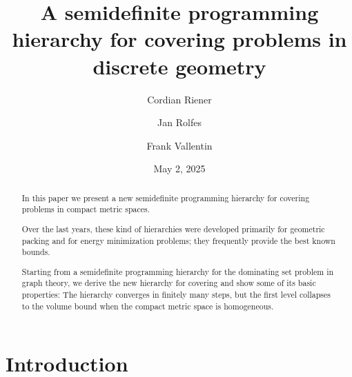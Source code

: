 \documentclass{amsart}
\begin{document}
\title{A semidefinite programming hierarchy for covering problems in
  discrete geometry}

\author{Cordian Riener}
\author{Jan Rolfes}
\author{Frank Vallentin}

\address{
  Cordian Riener,
  Department of Mathematics and Statistics, UiT The Arctic University
  of Norway,
  9037 Troms\o,
  Norway
}

\address{
  Jan Rolfes,
  Department of Mathematics, 
  Linköping University,
  SE-581 83 Linköping,
  Sweden}

\address{
  Frank Vallentin,
  Universit\"at zu K\"oln, Department Mathematik/Informatik, Abteilung
  Mathematik, Weyertal 86-90, 50931 K\"oln,  Germany}

\date{May 2, 2025}

\begin{abstract}
  In this paper we present a new semidefinite programming hierarchy
  for covering problems in compact metric spaces.

  Over the last years, these kind of hierarchies were developed
  primarily for geometric packing and for energy minimization
  problems; they frequently provide the best known bounds.

  Starting from a semidefinite programming hierarchy for the
  dominating set problem in graph theory, we derive the new hierarchy
  for covering and show some of its basic properties: The hierarchy
  converges in finitely many steps, but the first level collapses to
  the volume bound when the compact metric space is homogeneous.
\end{abstract}

\maketitle


%
%
%

\section{Introduction}
\label{sec:introduction}
\end{document}
